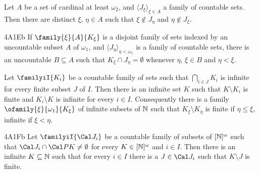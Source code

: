  Let $A$ be a set of cardinal at least
$\omega_2$, and $\langle J_{\xi}\rangle_{\xi\in A}$ a family of
countable sets.   Then there are distinct $\xi$, $\eta\in A$ such that
$\xi\notin J_{\eta}$ and $\eta\notin J_{\xi}$.

\spheader 4A1Eb If $\family{\xi}{A}{K_{\xi}}$ is a disjoint family of
sets indexed by an uncountable subset $A$ of $\omega_1$,
and $\langle J_{\eta}\rangle_{\eta<\omega_1}$ is a family
of countable sets, there is an uncountable $B\subseteq A$ such that
$K_{\xi}\cap J_{\eta}=\emptyset$ whenever $\eta$, $\xi\in B$ and
$\eta<\xi$.

 Let $\familyiI{K_i}$ be a
countable family of
sets such that $\bigcap_{i\in J}K_i$ is infinite for every finite
subset $J$ of $I$.   Then there is an infinite set $K$ such that
$K\setminus K_i$ is finite and $K_i\setminus K$ is infinite for every
$i\in I$.
Consequently there is a family
$\ofamily{\xi}{\omega_1}{K_{\xi}}$ of
infinite subsets of $\Bbb N$ such that $K_{\xi}\setminus K_{\eta}$ is
finite if $\eta\le\xi$, infinite if $\xi<\eta$.

\spheader 4A1Fb Let $\familyiI{\Cal J_i}$ be a countable family of
subsets of $[\Bbb N]^{\omega}$ such that
$\Cal J_i\cap\Cal PK\ne\emptyset$ for every
$K\in[\Bbb N]^{\omega}$ and $i\in I$.   Then there is an infinite
$K\subseteq\Bbb N$ such that for every $i\in I$ there is a
$J\in\Cal J_i$ such that $K\setminus J$ is finite.   

